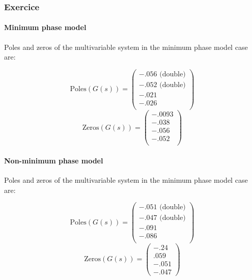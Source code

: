 \subsubsection{Exercice}

\paragraph{Minimum phase model}

Poles and zeros of the multivariable system in the minimum phase model case are:

$$
    \text{Poles}(G(s)) = 
    \left(\begin{array}{c}  
            -.056 \text{ (double)} \\
            -.052 \text{ (double)} \\
    -.021 \\
    -.026 \\
    \end{array}\right)
$$
$$
    \text{Zeros}(G(s)) = 
    \left(\begin{array}{c}
              -.0093 \\
                 -.038 \\
                    -.056 \\
                       -.052 \\
    \end{array}\right)
$$

\paragraph{Non-minimum phase model}

Poles and zeros of the multivariable system in the minimum phase model case are:

$$
\text{Poles}(G(s)) = \left(\begin{array}{c} -.051 \text{ (double)}\\ -.047 \text{ (double)} \\-.091 \\ -.086\\ \end{array}\right)
$$
$$
\text{Zeros}(G(s)) = \left(\begin{array}{c} -.24\\ .059\\ -.051\\ -.047 \end{array}\right)
$$

